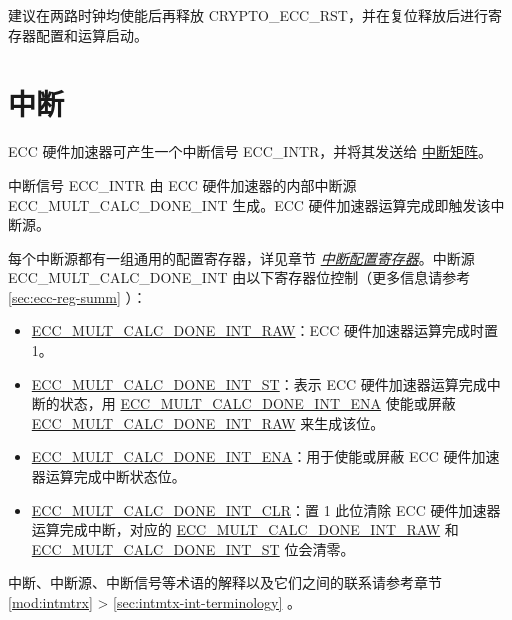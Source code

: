 \documentclass[main\_\_CN.tex]{subfiles}
\begin{document}
建议在两路时钟均使能后再释放 CRYPTO\_ECC\_RST，并在复位释放后进行寄存器配置和运算启动。



\section{中断}
\label{sec:ecc-interrupt}

\chipname{} ECC 硬件加速器可产生一个中断信号 ECC\_INTR，并将其发送给 \hyperref[mod:intmtrx]{中断矩阵}。

中断信号 ECC\_INTR 由 ECC 硬件加速器的内部中断源 \label{int:ECCMULTCALCDONEINT}{ECC\_MULT\_CALC\_DONE\_INT} 生成。ECC 硬件加速器运算完成即触发该中断源。

每个中断源都有一组通用的配置寄存器，详见章节 \hyperref[interrupt-config-registers]{\textit{中断配置寄存器}}。中断源 ECC\_MULT\_CALC\_DONE\_INT 由以下寄存器位控制（更多信息请参考 \ref{sec:ecc-reg-summ} \textit{}）：

\begin{itemize}
    \item \hyperref[fielddesc:ECCMULTCALCDONEINTRAW]{ECC\_MULT\_CALC\_DONE\_INT\_RAW}：ECC 硬件加速器运算完成时置 1。
    \item \hyperref[fielddesc:ECCMULTCALCDONEINTST]{ECC\_MULT\_CALC\_DONE\_INT\_ST}：表示 ECC 硬件加速器运算完成中断的状态，用 \hyperref[fielddesc:ECCMULTCALCDONEINTENA]{ECC\_MULT\_CALC\_DONE\_INT\_ENA} 使能或屏蔽 \hyperref[fielddesc:ECCMULTCALCDONEINTRAW]{ECC\_MULT\_CALC\_DONE\_INT\_RAW} 来生成该位。
    \item \hyperref[fielddesc:ECCMULTCALCDONEINTENA]{ECC\_MULT\_CALC\_DONE\_INT\_ENA}：用于使能或屏蔽 ECC 硬件加速器运算完成中断状态位。
    \item \hyperref[fielddesc:ECCMULTCALCDONEINTCLR]{ECC\_MULT\_CALC\_DONE\_INT\_CLR}：置 1 此位清除 ECC 硬件加速器运算完成中断，对应的 \hyperref[fielddesc:ECCMULTCALCDONEINTRAW]{ECC\_MULT\_CALC\_DONE\_INT\_RAW} 和 \hyperref[fielddesc:ECCMULTCALCDONEINTST]{ECC\_MULT\_CALC\_DONE\_INT\_ST} 位会清零。
\end{itemize}

\begin{tiplisting}
中断、中断源、中断信号等术语的解释以及它们之间的联系请参考章节 \ref{mod:intmtrx} \textit{} > \ref{sec:intmtx-int-terminology} \textit{}。
\end{tiplisting}
\end{document}
